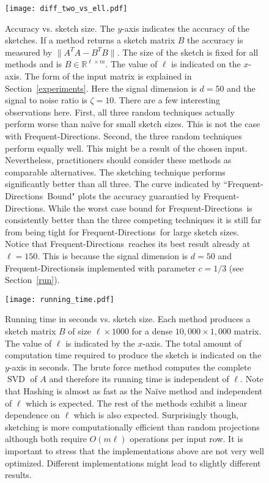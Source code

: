 \documentclass[]{article}
\newcommand{\SVD}{\operatorname{SVD}}
\newcommand{\R}{{\mathbb R}}
\newcommand{\FD}{Frequent-Directions}
\newcommand{\myfigurewidth}{0.7}
\begin{document}
\begin{figure}[htbp]
\begin{center}
\texttt{[image: diff\_two\_vs\_ell.pdf]}
\caption{Accuracy vs. sketch size. The $y$-axis indicates the accuracy of the sketches.
If a method returns a sketch matrix $B$ the accuracy is measured by $\|A^{T}A - B^{T}B\|$.
The size of the sketch is fixed for all methods and is $B \in \R^{\ell \times m}$.
The value of $\ell$ is indicated on the $x$-axis.
The form of the input matrix is explained in Section~\ref{experiments}. 
Here the signal dimension is $d=50$ and the signal to noise ratio is $\zeta = 10$.
There are a few interesting observations here. First, all three random techniques actually perform worse than
na\"ive for small sketch sizes. This is not the case with \FD. 
Second, the three random techniques perform equally well. This might be a result of the chosen input.
Nevertheless, practitioners should consider these methods as comparable alternatives.
The sketching technique performs significantly better than all three.
The curve indicated by ``\FD~Bound" plots the accuracy guarantied by \FD. 
While the worst case bound for \FD~is consistently better than the three competing techniques
it is still far from being tight for \FD~for large sketch sizes. 
Notice that \FD~reaches its best result already at $\ell = 150$.
This is because the signal dimension is $d=50$ and \FD is implemented with parameter $c=1/3$ (see Section~\ref{run}).
}
\label{diff_two_vs_ell}
\end{center}
\end{figure}

\begin{figure}[htbp]
\begin{center}
\texttt{[image: running\_time.pdf]}
\caption{Running time in seconds vs. sketch size. 
Each method produces a sketch matrix $B$ of size $\ell \times 1000$ for a dense $10,000 \times 1,000$ matrix. 
The value of $\ell$ is indicated by the $x$-axis. 
The total amount of computation time required to produce the sketch is indicated on the $y$-axis in seconds.
The brute force method computes the complete $\SVD$ of $A$ and therefore its running time is independent of $\ell$.
Note that Hashing is almost as fast as the Na\"ive method and independent of $\ell$ which is expected.
The rest of the methods exhibit a linear dependence on $\ell$ which is also expected.
Surprisingly though, sketching is more computationally efficient than random projections although both require $O(m \ell)$ operations per input row.
It is important to stress that the implementations above are not very well optimized. 
Different implementations might lead to slightly different results.
}
\label{running_time}
\end{center}
\end{figure}
\end{document}
